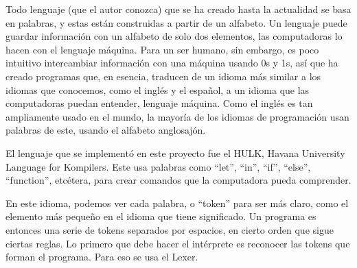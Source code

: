 \documentclass{article}
\begin{document}
Todo lenguaje (que el autor conozca) que se ha creado hasta la actualidad se basa en palabras, y estas están construidas a partir de un alfabeto. Un lenguaje puede guardar información con un alfabeto de solo dos elementos, las computadoras lo hacen con el lenguaje máquina. Para un ser humano, sin embargo, es poco intuitivo intercambiar información con una máquina usando 0s y 1s, así que ha creado programas que, en esencia, traducen de un idioma más similar a los idiomas que conocemos, como el inglés y el español, a un idioma que las computadoras puedan entender, lenguaje máquina. Como el inglés es tan ampliamente usado en el mundo, la mayoría de los idiomas de programación usan palabras de este, usando el alfabeto anglosajón.

El lenguaje que se implementó en este proyecto fue el HULK, Havana University Language for Kompilers. Este usa palabras como “let”, “in”, “if”, “else”, “function”, etcétera, para crear comandos que la computadora pueda comprender.

En este idioma, podemos ver cada palabra, o “token” para ser más claro, como el elemento más pequeño en el idioma que tiene significado. Un programa es entonces una serie de tokens separados por espacios, en cierto orden que sigue ciertas reglas. Lo primero que debe hacer el intérprete es reconocer las tokens que forman el programa. Para eso se usa el Lexer.
\end{document}
